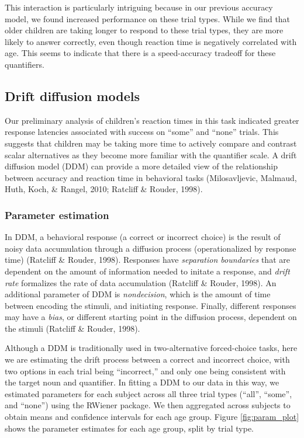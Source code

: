 \documentclass[10pt, letterpaper]{article}
\begin{document}
This interaction is particularly intriguing because in our previous
accuracy model, we found increased performance on these trial types.
While we find that older children are taking longer to respond to these
trial types, they are more likely to answer correctly, even though
reaction time is negatively correlated with age. This seems to indicate
that there is a speed-accuracy tradeoff for these quantifiers.

\subsection{Drift diffusion models}\label{drift-diffusion-models}

Our preliminary analysis of children's reaction times in this task
indicated greater response latencies associated with success on ``some''
and ``none'' trials. This suggests that children may be taking more time
to actively compare and contrast scalar alternatives as they become more
familiar with the quantifier scale. A drift diffusion model (DDM) can
provide a more detailed view of the relationship between accuracy and
reaction time in behavioral tasks (Milosavljevic, Malmaud, Huth, Koch,
\& Rangel, 2010; Ratcliff \& Rouder, 1998).

\subsubsection{Parameter estimation}\label{parameter-estimation}

In DDM, a behavioral response (a correct or incorrect choice) is the
result of noisy data accumulation through a diffusion process
(operationalized by response time) (Ratcliff \& Rouder, 1998). Responses
have \emph{separation boundaries} that are dependent on the amount of
information needed to initate a response, and \emph{drift rate}
formalizes the rate of data accumulation (Ratcliff \& Rouder, 1998). An
additional parameter of DDM is \emph{nondecision}, which is the amount
of time between encoding the stimuli, and initiating response. Finally,
different responses may have a \emph{bias}, or different starting point
in the diffusion process, dependent on the stimuli (Ratcliff \& Rouder,
1998).

Although a DDM is traditionally used in two-alternative forced-choice
tasks, here we are estimating the drift process between a correct and
incorrect choice, with two options in each trial being ``incorrect,''
and only one being consistent with the target noun and quantifier. In
fitting a DDM to our data in this way, we estimated parameters for each
subject across all three trial types (``all'', ``some'', and ``none'')
using the RWiener package. We then aggregated across subjects to obtain
means and confidence intervals for each age group. Figure
\ref{fig:param_plot} shows the parameter estimates for each age group,
split by trial type.
\end{document}
